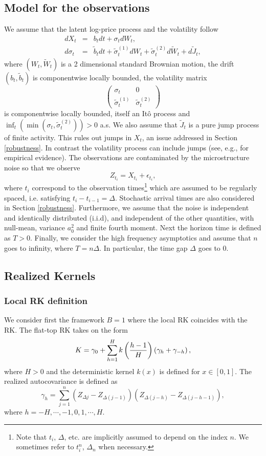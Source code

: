 \documentclass[11pt]{article}
\numberwithin{equation}{section}
\theoremstyle{plain}
\theoremstyle{remark}
\begin{document}
\subsection{Model for the observations}
\label{model}
We assume that the latent log-price process and the volatility follow
\begin{eqnarray}
dX_t & = & b_t dt + \sigma_t dW_t,\\
d \sigma_t & = & \tilde{b}_t dt + \tilde{\sigma}_t^{(1)} dW_t + \tilde{\sigma}_t^{(2)} d\tilde{W}_t + d\tilde{J}_t,
\end{eqnarray}
where $(W_t, \tilde{W}_t)$ is a 2 dimensional standard Brownian motion, the drift $(b_t,\tilde{b}_t)$ is componentwise locally bounded, the volatility matrix 
$$\left(\begin{matrix}  \sigma_t & 0 \\ 
\tilde{\sigma}_t^{(1)} & \tilde{\sigma}_t^{(2)} 
\end{matrix}\right)$$ 
is componentwise locally bounded, itself an It\^{o} process and $\inf_t (\min(\sigma_t, \tilde{\sigma}_t^{(2)})) > 0$ a.s. We also assume that $\tilde{J}_t$ is a pure jump process of finite activity. This rules out jumps in $X_t$, an issue addressed in Section \ref{robustness}. In contrast the volatility process can include jumps (see, e.g., \cite{todorov2011volatility} for empirical evidence). The observations are contaminated by the microstructure noise so that we observe 
$$Z_{t_i} = X_{t_i} + \epsilon_{t_i},$$ 
where $t_i$ correspond to the observation times\footnote{Note that $t_i$, $\Delta$, etc. are implicitly assumed to depend on the index $n$. We sometimes refer to $t_i^n$, $\Delta_n$ when necessary.} which are assumed to be regularly spaced, i.e. satisfying $t_{i} - t_{i-1} = \Delta$. Stochastic arrival times are also considered in Section \ref{robustness}. Furthermore, we assume that the noise is independent and identically distributed (i.i.d), and independent of the other quantities, with null-mean, variance $a_0^2$ and finite fourth moment. Next the horizon time is defined as $T >0$. Finally, we consider the high frequency asymptotics and assume that $n$ goes to infinity, where $T = n \Delta$. In particular, the time gap $\Delta$ goes to $0$.  

\subsection{Realized Kernels}
\label{RK}

\subsubsection{Local RK definition}
We consider first the framework $B=1$ where the local RK coincides with the RK. The flat-top RK takes on the form
$$K = \gamma_0 + \sum_{h=1}^{H} k \left( \frac{h-1}{H} \right) \left( \gamma_h + \gamma_{-h} \right),$$ 
where $H > 0$ and the deterministic kernel $k(x)$ is defined for $x \in [0,1]$. The realized autocovariance is defined as
$$\gamma_h = \sum_{j=1}^{n} (Z_{\Delta j} - Z_{\Delta (j-1)}) (Z_{\Delta (j - h)} - Z_{\Delta (j-h-1)}),$$
where $h = -H, \cdots, -1, 0, 1 , \cdots, H$. 
\end{document}
